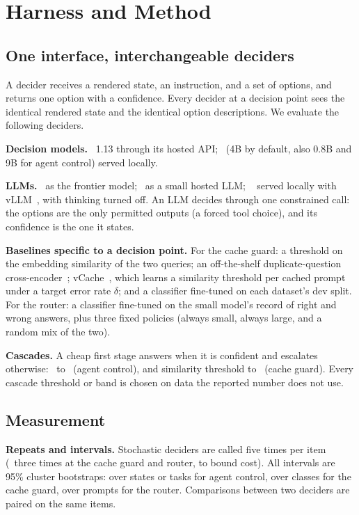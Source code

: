\section{Harness and Method}
\label{sec:method}

\subsection{One interface, interchangeable deciders}

A decider receives a rendered state, an instruction, and a set of options, and returns one option with a confidence.
Every decider at a decision point sees the identical rendered state and the identical option descriptions.
We evaluate the following deciders.

\textbf{Decision models.} \jev\ 1.13 through its hosted API; \kev\ (4B by default, also 0.8B and 9B for agent control) served locally.

\textbf{LLMs.} \gbig\ as the frontier model; \goss\ as a small hosted LLM; \qwen~\cite{yang2025qwen3} served locally with vLLM~\cite{kwon2023vllm}, with thinking turned off.
An LLM decides through one constrained call: the options are the only permitted outputs (a forced tool choice), and its confidence is the one it states.

\textbf{Baselines specific to a decision point.}
For the cache guard: a threshold on the embedding similarity of the two queries; an off-the-shelf duplicate-question cross-encoder~\cite{reimers2019sbert}; vCache~\cite{schroeder2025vcache}, which learns a similarity threshold per cached prompt under a target error rate $\delta$; and a classifier fine-tuned on each dataset's dev split.
For the router: a classifier fine-tuned on the small model's record of right and wrong answers, plus three fixed policies (always small, always large, and a random mix of the two).

\textbf{Cascades.} A cheap first stage answers when it is confident and escalates otherwise: \jev\ to \gbig\ (agent control), and similarity threshold to \jev\ (cache guard).
Every cascade threshold or band is chosen on data the reported number does not use.

\subsection{Measurement}

\textbf{Repeats and intervals.} Stochastic deciders are called five times per item (\gbig\ three times at the cache guard and router, to bound cost).
All intervals are 95\% cluster bootstraps: over states or tasks for agent control, over classes for the cache guard, over prompts for the router.
Comparisons between two deciders are paired on the same items.

